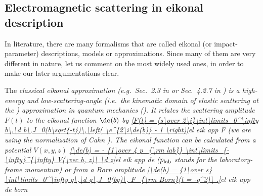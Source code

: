 
\subsection[em sc eik]{Electromagnetic scattering in eikonal description}

In literature, there are many formalisms that are called eikonal (or impact-parameter) descriptions, models or approximations. Since many of them are very different in nature, let us comment on the most widely used ones, in order to make our later argumentations clear.

The \em{classical eikonal approximation} (e.g.~Sec.~2.3 in  or Sec.~4.2.7 in ) is a high-energy and low-scattering-angle (i.e.~the kinematic domain of elastic scattering at the ) approximation in quantum mechanics (). It relates the scattering amplitude $F(t)$ to the eikonal function $\de(b)$ by
\eqref{F(t) = {s\over 2\i}\int\limits_0^\infty b\,\d b\,J_0(b\sqrt{-t})\,\left( \e^{2\i\de(b)} - 1 \right)}{el eik app F}
(we are using the normalization of Cahn ). The \em{eikonal} function can be calculated from a potential $V(x, y, z)$
\eqref{\de(b) = - {1\over 4 p_{\rm lab}} \int\limits_{-\infty}^{\infty} V(\vec b, z)\ \d z}{el eik app de}
($p_{\rm lab}$ stands for the laboratory-frame momentum) or from a Born amplitude
\eqref{\de(b) = {1\over s} \int\limits_0^\infty q\,\d q\,J_0(bq)\, F_{\rm Born}(t = -q^2)\ .}{el eik app de born}

